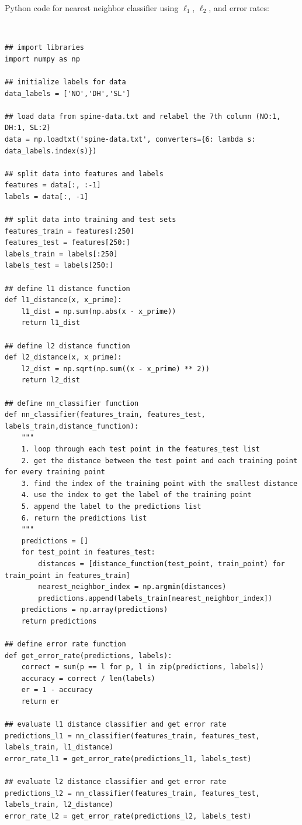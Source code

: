\documentclass{article}
\begin{document}
\parbox{\textwidth}{Python code for nearest neighbor classifier using $\ell_1$, $\ell_2$, and error rates:}\\
\begin{center}

\begin{lstlisting}
## import libraries
import numpy as np

## initialize labels for data
data_labels = ['NO','DH','SL']
  
## load data from spine-data.txt and relabel the 7th column (NO:1, DH:1, SL:2)          
data = np.loadtxt('spine-data.txt', converters={6: lambda s: data_labels.index(s)})
  
## split data into features and labels
features = data[:, :-1]
labels = data[:, -1]
  
## split data into training and test sets
features_train = features[:250]
features_test = features[250:]
labels_train = labels[:250]
labels_test = labels[250:]

## define l1 distance function
def l1_distance(x, x_prime):
    l1_dist = np.sum(np.abs(x - x_prime))
    return l1_dist

## define l2 distance function
def l2_distance(x, x_prime):
    l2_dist = np.sqrt(np.sum((x - x_prime) ** 2))
    return l2_dist

## define nn_classifier function
def nn_classifier(features_train, features_test, labels_train,distance_function):
    """
    1. loop through each test point in the features_test list
    2. get the distance between the test point and each training point for every training point
    3. find the index of the training point with the smallest distance
    4. use the index to get the label of the training point
    5. append the label to the predictions list
    6. return the predictions list
    """
    predictions = []
    for test_point in features_test:
        distances = [distance_function(test_point, train_point) for train_point in features_train]
        nearest_neighbor_index = np.argmin(distances)
        predictions.append(labels_train[nearest_neighbor_index])
    predictions = np.array(predictions)
    return predictions

## define error rate function
def get_error_rate(predictions, labels):
    correct = sum(p == l for p, l in zip(predictions, labels))
    accuracy = correct / len(labels)
    er = 1 - accuracy
    return er

## evaluate l1 distance classifier and get error rate
predictions_l1 = nn_classifier(features_train, features_test, labels_train, l1_distance)
error_rate_l1 = get_error_rate(predictions_l1, labels_test)

## evaluate l2 distance classifier and get error rate
predictions_l2 = nn_classifier(features_train, features_test, labels_train, l2_distance)
error_rate_l2 = get_error_rate(predictions_l2, labels_test)
\end{lstlisting}
    
\end{center}
\end{document}
